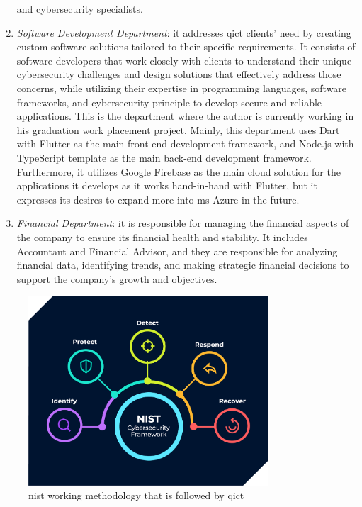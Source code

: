 \begin{multicols}{2}
\begin{enumerate}
                  and cybersecurity specialists.
            \item \textit{Software Development Department}: it addresses \acrshort{qict} clients' need by creating
                  custom software solutions tailored to their specific requirements. It consists of software
                  developers that work closely with clients to understand their unique cybersecurity challenges and
                  design solutions that effectively address those concerns, while utilizing their expertise in
                  programming languages, software frameworks, and cybersecurity principle to develop secure and
                  reliable applications. This is the department where the author is currently working in his
                  graduation work placement project. Mainly, this department uses Dart with Flutter as the main
                  front-end development framework, and Node.js with TypeScript template as the main back-end
                  development framework. Furthermore, it utilizes Google Firebase as the  main cloud solution for
                  the applications it develops as it works hand-in-hand with Flutter, but it expresses its
                  desires to expand more into \acrshort{ms} Azure in the future.
            \item \textit{Financial Department}: it is responsible for managing the financial aspects of the company
                  to ensure its financial health and stability. It includes Accountant and Financial Advisor, and
                  they are responsible for analyzing financial data, identifying trends, and making strategic
                  financial decisions to support the company's growth and objectives.
      \end{enumerate}
\end{multicols}

\begin{figure}[htbp]
      \centering
      \includegraphics[width=0.8\textwidth]{Figures/qict-working-method.png}
      \caption{\acrshort{nist} working methodology that is followed by \acrshort{qict}}
\end{figure}

